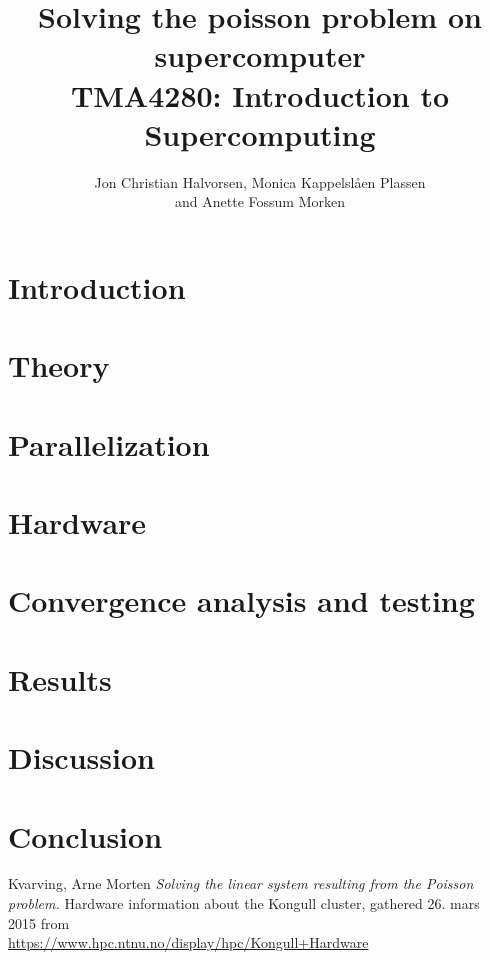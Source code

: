 \documentclass[12pt, a4paper]{article} %
\title{Solving the poisson problem on supercomputer \\
TMA4280: Introduction to Supercomputing}
\author[]{Jon Christian Halvorsen, Monica Kappelslåen Plassen \\and Anette Fossum Morken}
\date{}
\begin{document}
\maketitle
{}

\section*{Introduction}


\section*{Theory}


\section*{Parallelization}

 
\section*{Hardware}
 
 
\section*{Convergence analysis and testing}


\section*{Results}


\section*{Discussion}


\section*{Conclusion}


\begin{thebibliography}{10}
 Kvarving, Arne Morten \emph{Solving the linear system resulting from the Poisson problem.}
 Hardware information about the Kongull cluster, gathered 26. mars 2015 from \\ \url{https://www.hpc.ntnu.no/display/hpc/Kongull+Hardware}
\end{thebibliography}
\end{document}
